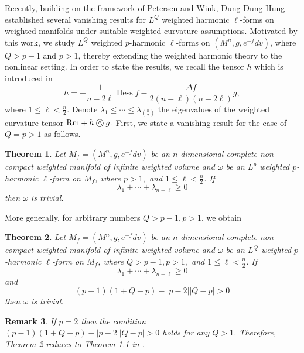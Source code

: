 \documentclass[10pt,a4paper]{amsart}
\newtheorem{theorem}{\indent\sc Theorem}[section]
\newtheorem{remark}[theorem]{\indent\sc Remark}
\numberwithin{equation}{section}
\newcommand{\KN}{\mathbin{\bigcirc\mspace{-15mu}\wedge\mspace{3mu}}}
\begin{document}
Recently, building on the framework of Petersen and Wink, Dung-Dung-Hung \cite{DDH25} established several vanishing results for $L^Q$ weighted  harmonic $\ell$-forms on weighted manifolds under suitable weighted curvature assumptions. Motivated by this work, we study $L^Q$ weighted $p$-harmonic $\ell$-forms on $(M^n,g,e^{-f}dv)$, where $Q>p-1$ and $p>1$, thereby extending the weighted harmonic theory to the nonlinear setting. 
In order to state the results, we recall the tensor $h$ which is introduced in \cite{DDH25} 
	$$
h=-\frac{1}{n-2\ell}\operatorname{Hess}f
-\frac{\Delta f}{2(n-\ell)(n-2\ell)}g,
$$ where $1\le \ell < \frac{n}{2}$.
Denote $\lambda_1\le \cdots \le \lambda_{\binom{n}{2}}$ the eigenvalues 
of the weighted curvature tensor
$\mathrm{Rm}+h \KN g.$
 First, we state a vanishing result for the case of $Q=p>1$  as follows.
\begin{theorem}
	Let $M_f=(M^n,g,e^{-f}dv)$ be an $n$-dimensional complete non-compact weighted manifold of infinite weighted volume and $\omega$ be an $L^p$ weighted $p$-harmonic $\ell$-form on $M_f$, where $p>1,$ and $1\le \ell < \frac{n}{2}$. 
	If	$$\lambda_1+\cdots+\lambda_{n-\ell}\ge 0	$$
	then $\omega$ is trivial.
\end{theorem}
 More generally, for arbitrary numbers $Q>p-1,p>1$, we obtain 
\begin{theorem}\label{th1}
	Let $M_f=(M^n,g,e^{-f}dv)$ be an $n$-dimensional complete non-compact weighted manifold of infinite weighted volume and $\omega$ be an $L^Q$ weighted $p$-harmonic $\ell$-form on $M_f$, where $Q>p-1,p>1,$ and $1\le \ell < \frac{n}{2}$. 
	If	$$\lambda_1+\cdots+\lambda_{n-\ell}\ge 0	$$
	and $$(p-1)(1+Q-p)-|p-2||Q-p|>0$$
	then $\omega$ is trivial.
\end{theorem}
\begin{remark}
	If $p=2$ then the condition $(p-1)(1+Q-p)-|p-2||Q-p|>0$ holds for any $Q>1$. Therefore, Theorem \ref{th1} reduces to Theorem 1.1 in \cite{DDH25}.
\end{remark}
\end{document}
